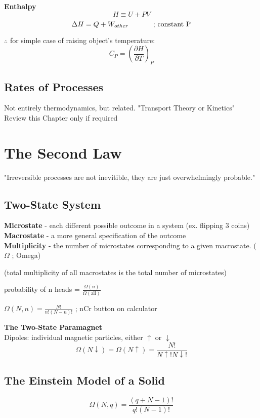 \documentclass[11pt]{article}
\theoremstyle{definition}
\begin{document}
\begin{shaded}
\textbf{Enthalpy}
\[H \equiv U + PV\]
\begin{equation}
    \Delta H = Q + W_{other} \text{ \hspace{10mm} ; constant P}
\end{equation}
\end{shaded}

$\therefore$ for simple case of raising object's temperature:
\[C_P = \left(\frac{\partial H}{\partial T}\right)_P \]

\subsection{Rates of Processes}
Not entirely thermodynamics, but related. "Transport Theory or Kinetics"\\
Review this Chapter only if required

\section{The Second Law}
"Irreversible processes are not inevitible, they are just overwhelmingly probable."

\subsection{Two-State System}
\textbf{Microstate} - each different possible outcome in a system (ex. flipping 3 coins)\\
\textbf{Macrostate} - a more general specification of the outcome\\
\textbf{Multiplicity} - the number of microstates corresponding to a given macrostate. ($\Omega$ ; Omega)

(total multiplicity of all macrostates is the total number of microstates)

probability of n heads = $\frac{\Omega (n)}{\Omega (\text{all})}$

$\Omega (N,n) = \frac{N!}{n!(N-n)!}$ ; nCr button on calculator

\textbf{The Two-State Paramagnet}\\
Dipoles: individual magnetic particles, either $\uparrow$ or $\downarrow$
\[ \Omega (N\downarrow) = \Omega (N\uparrow) = \frac{N!}{N\uparrow!N\downarrow!} \]

\subsection{The Einstein Model of a Solid}
\[ \Omega (N,q) = \frac{(q+N-1)!}{q!(N-1)!}\]
\end{document}
